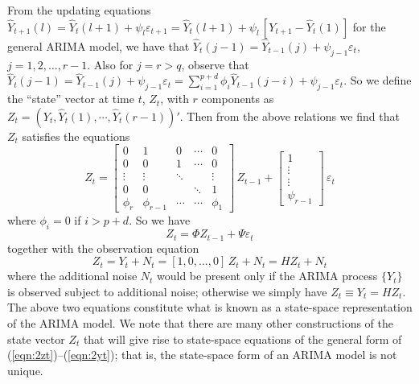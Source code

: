 From the updating equations $\hat{Y}_{t+1}(l) = \hat{Y}_t(l+1) + \psi_l\varepsilon_{t+1}= \hat{Y}_t(l + 1) + \psi_l\, [Y_{t+1} - \hat{Y}_t(1)]$ for the general ARIMA model, we have that $\hat{Y}_t(j - 1)= \hat{Y}_{t-1}(j) + \psi_{j-1}\varepsilon_t$, $j = 1,2,\ldots,r-1$. Also for $j= r>q$, observe that $\hat{Y}_t(j-1)= \hat{Y}_{t-1}(j) + \psi_{j-1}\varepsilon_t = \sum_{i=1}^{p+d}\phi_i\hat{Y}_{t-1}(j - i) + \psi_{j-1}\varepsilon_t$. So we define the ``state'' vector at time $t$, $Z_t$, with $r$ components as $Z_t = (Y_t, \hat{Y}_t(1),\cdots,\hat{Y}_t(r-1))'$. Then from the above relations we find that $Z_t$ satisfies the equations
	\[ 
	Z_t = \begin{bmatrix}
                        0 & 1 & 0 & \cdots & 0 \\
                        0 & 0 & 1 & \cdots &  0 \\
                        \vdots & \vdots &\ddots  &  &  \vdots \\
                        0 & 0 &  & \ddots &  1 \\
                        \phi_r & \phi_{r-1} & \cdots & \cdots &  \phi_1
                    \end{bmatrix}
                    \,Z_{t-1} + 
                    \begin{bmatrix}
                    1\\ \vdots \\ \vdots \\ \psi_{r-1}
                    \end{bmatrix}
                    \,\varepsilon_t
                    \]
where $\phi_i = 0$ if $i > p + d$. So we have
	\begin{equation}\label{eqn:2secondzt}
	Z_t = \Phi Z_{t-1} + \Psi\varepsilon_t
	\end{equation}
together with the observation equation
	\begin{equation}\label{eqn:2thirdzt}
	Z_t = Y_t + N_t = [1,0,\ldots,0] \,Z_t + N_t = H Z_t + N_t
	\end{equation}
where the additional noise $N_t$ would be present only if the ARIMA process $\{Y_t\}$ is observed subject to additional noise; otherwise we simply have $Z_t \equiv Y_t = HZ_t$. The above two equations constitute what is known as a state-space representation of the ARIMA model. We note that there are many other constructions of the state vector $Z_t$ that will give rise to state-space equations of the general form of (\ref{eqn:2zt})--(\ref{eqn:2yt}); that is, the state-space form of an ARIMA model is not unique.

